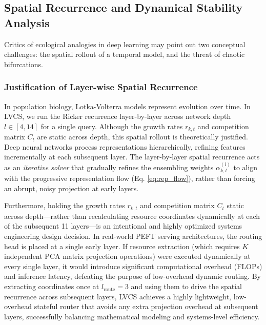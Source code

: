 \subsection{Spatial Recurrence and Dynamical Stability Analysis}
\label{sec:stability}

Critics of ecological analogies in deep learning may point out two conceptual challenges: the spatial rollout of a temporal model, and the threat of chaotic bifurcations.

\subsubsection{Justification of Layer-wise Spatial Recurrence}
In population biology, Lotka-Volterra models represent evolution over time. In LVCS, we run the Ricker recurrence layer-by-layer across network depth $l \in [4, 14]$ for a single query. Although the growth rates $r_{k, t}$ and competition matrix $C_t$ are static across depth, this spatial rollout is theoretically justified. Deep neural networks process representations hierarchically, refining features incrementally at each subsequent layer. The layer-by-layer spatial recurrence acts as an \emph{iterative solver} that gradually refines the ensembling weights $\alpha_{k, t}^{(l)}$ to align with the progressive representation flow (Eq. \ref{eq:rep_flow}), rather than forcing an abrupt, noisy projection at early layers.

Furthermore, holding the growth rates $r_{k, t}$ and competition matrix $C_t$ static across depth—rather than recalculating resource coordinates dynamically at each of the subsequent 11 layers—is an intentional and highly optimized systems engineering design decision. In real-world PEFT serving architectures, the routing head is placed at a single early layer. If resource extraction (which requires $K$ independent PCA matrix projection operations) were executed dynamically at every single layer, it would introduce significant computational overhead (FLOPs) and inference latency, defeating the purpose of low-overhead dynamic routing. By extracting coordinates once at $l_{\text{route}} = 3$ and using them to drive the spatial recurrence across subsequent layers, LVCS achieves a highly lightweight, low-overhead stateful router that avoids any extra projection overhead at subsequent layers, successfully balancing mathematical modeling and systems-level efficiency.

